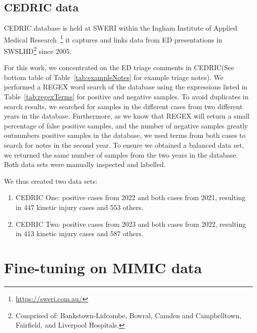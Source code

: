 \documentclass[a4paper,12pt]{article}
\newcommand{\cedric}{\ac{CEDRIC}\xspace}
\newcommand{\inghamOne}{CEDRIC One\xspace}   %
\newcommand{\inghamTwo}{CEDRIC Two\xspace}  %
\begin{document}
\subsection{\cedric data}

\acf{CEDRIC} database is held at \ac{SWERI} within the Ingham Institute of Applied Medical Research~\footnote{\url{https://sweri.com.au/}}
it captures and links data from 
\ac{ED} presentations in \ac{SWSLHD}\footnote{Comprised of: Bankstown-Lidcombe, Bowral, Camden and Campbelltown, Fairfield, and Liverpool Hospitals.} 
since 2005. 

For this work, we concentrated on the \ac{ED} triage comments in \cedric (See bottom table of Table~\ref{tab:exampleNotes} for example triage notes). We performed a \ac{REGEX} word search of the database using the expressions listed in Table~\ref{tab:regexTerms} for positive and negative samples. To avoid duplicates in search results, we searched for samples in the different cases from two different years in the database. Furthermore, as we know that \ac{REGEX} will return a small percentage of false positive samples, and the number of negative samples greatly outnumbers positive samples in the database, we used terms from both cases to search for notes in the second year. To ensure we obtained a balanced data set, we returned the same number of samples from the two years in the database. Both data sets were manually inspected and labelled. 

We thus created two data sets: 
\vspace{-2mm}
\begin{enumerate}
    \item \inghamOne : positive cases from 2022 and both cases from 2021, resulting in 447 kinetic injury cases and 553 others. 
    \item \inghamTwo : positive cases from 2023 and both cases from 2022, resulting in 413 kinetic injury cases and 587 others. 
\end{enumerate}




\section{Fine-tuning on MIMIC data}
\label{sec:fineTune}
\end{document}
